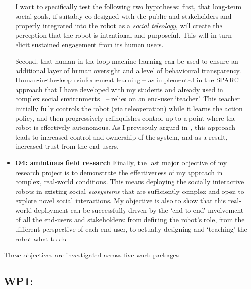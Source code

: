 \begin{itemize}
        I want to specifically test the following two hypotheses: first, that
        long-term social goals, if suitably co-designed with the public and
        stakeholders and properly integrated into the robot as a \emph{social
        teleology}, will create the perception that the robot is intentional and
        purposeful. This will in turn elicit sustained engagement from its human
        users.

        Second, that human-in-the-loop machine learning can be used to ensure an
        additional layer of human oversight and a level of behavioural
        transparency.  Human-in-the-loop reinforcement learning -- as
        implemented in the SPARC approach that I have developed with my students
        and already used in complex social
        environments~\parencite{senft2017supervised,senft2019teaching,winkle2020insitu}
        -- relies on an end-user `teacher'. This teacher initially fully
        controls the robot (via teleoperation) while it learns the action
        policy, and then progressively relinquishes control up to a point where
        the robot is effectively autonomous. As I previsouly argued
        in~\textcite{senft2019teaching}, this approach leads to increased
        control and ownership of the system, and as a result, increased trust
        from the end-users.


    \item{\bf O4: ambitious field research} Finally, the last major objective of
        my research project is to demonstrate the effectiveness of my approach
        in complex, real-world conditions. This means deploying the socially
        interactive robots in existing social \emph{ecosystems} that are
        sufficiently complex and open to explore novel social interactions. My
        objective is also to show that this real-world deployment can be
        successfully driven by the `end-to-end' involvement of all the end-users
        and stakeholders: from defining the robot's role, from the different
        perspective of each end-user, to actually designing and `teaching' the
        robot what to do.


\end{itemize}


These objectives are investigated across five work-packages.

\subsection{WP1: \textbf{\wpOne}}

